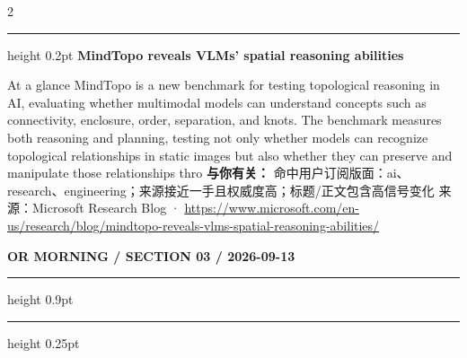 \documentclass[10.5pt]{ctexart}
\begin{document}
\begin{multicols}{2}
\vspace{2mm}
\hrule height 0.2pt
\vspace{2mm}
{\large\bfseries MindTopo reveals VLMs’ spatial reasoning abilities}\par
At a glance MindTopo is a new benchmark for testing topological reasoning in AI, evaluating whether multimodal models can understand concepts such as connectivity, enclosure, order, separation, and knots. The benchmark measures both reasoning and planning, testing not only whether models can recognize topological relationships in static images but also whether they can preserve and manipulate those relationships thro
\textbf{与你有关：} 命中用户订阅版面：ai、research、engineering；来源接近一手且权威度高；标题/正文包含高信号变化
{\footnotesize\color{ormuted} 来源：Microsoft Research Blog · \url{https://www.microsoft.com/en-us/research/blog/mindtopo-reveals-vlms-spatial-reasoning-abilities/}}
\end{multicols}
\newpage
{\small\bfseries OR MORNING / SECTION 03 / 2026-09-13}
\vspace{2mm}
\hrule height 0.9pt
\vspace{1.5mm}
\hrule height 0.25pt
\vspace{4mm}
\end{document}
